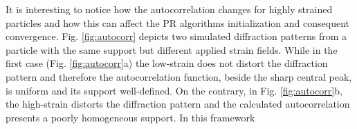 




It is interesting to notice how the autocorrelation changes for highly strained particles and
how this can affect the PR algorithms initialization and consequent convergence. Fig. \ref{fig:autocorr}
depicts two simulated diffraction patterns from a particle with the same support but different applied strain fields. 
While in the first case (Fig. \ref{fig:autocorr}a) the low-strain does not distort the diffraction pattern and therefore the autocorrelation 
function, beside the sharp central peak, is uniform and its support well-defined. On the contrary, in Fig. \ref{fig:autocorr}b, 
the high-strain distorts the diffraction pattern and the calculated autocorrelation presents a poorly homogeneous support. 
In this framework 

